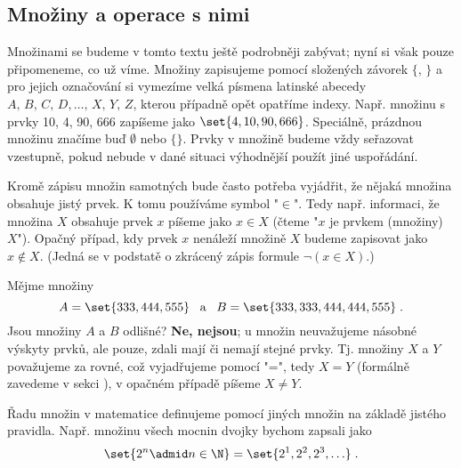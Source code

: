 \subsection{Množiny a operace s nimi}\label{subsec:mnoziny_a_operace_s_nimi}

Množinami se budeme v tomto textu ještě podrobněji zabývat; nyní si však pouze připomeneme, co už víme. Množiny zapisujeme pomocí složených závorek $\{,\,\}$ a pro jejich označování si vymezíme velká písmena latinské abecedy\linebreak $A,\,B,\,C,\,D,\ldots,\,X,\,Y,\,Z$, kterou případně opět opatříme indexy. Např. množinu s prvky 10, 4, 90, 666 zapíšeme jako $\set{4, 10, 90, 666}$. Speciálně, prázdnou množinu značíme buď $\emptyset$ nebo $\{\}$. Prvky v množině budeme vždy seřazovat vzestupně, pokud nebude v dané situaci výhodnější použít jiné uspořádání.\par
Kromě zápisu množin samotných bude často potřeba vyjádřit, že nějaká množina obsahuje jistý prvek. K tomu používáme symbol "$\in$". Tedy např. informaci, že množina $X$ obsahuje prvek $x$ píšeme jako $x\in X$ (čteme "$x$ je prvkem (množiny) $X$"). Opačný případ, kdy prvek $x$ nenáleží množině $X$ budeme zapisovat jako $x \notin X$. (Jedná se v podstatě o zkrácený zápis formule $\neg (x \in X)$.)\par
Mějme množiny
\begin{equation*}
    A=\set{333, 444, 555}\;\;\;\text{a}\;\;\;B=\set{333, 333, 444, 444, 555}\; .
\end{equation*}
Jsou množiny $A$ a $B$ odlišné? \textbf{Ne, nejsou}; u množin neuvažujeme násobné výskyty prvků, ale pouze, zdali mají či nemají stejné prvky. Tj. množiny $X$ a $Y$ považujeme za rovné, což vyjadřujeme pomocí "=", tedy $X=Y$ (formálně zavedeme v sekci ), v opačném případě píšeme $X \neq Y$.\par
Řadu množin v matematice definujeme pomocí jiných množin na základě jistého pravidla. Např. množinu všech mocnin dvojky bychom zapsali jako
\begin{equation*}
    \set{2^n \admid n \in \N}=\set{2^1, 2^2, 2^3, \ldots}\; .
\end{equation*}

